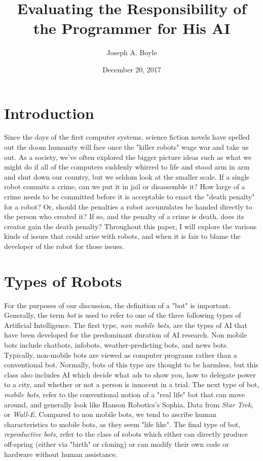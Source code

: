 \documentclass[12]{article}
\title{Evaluating the Responsibility of the Programmer for His AI}
\author{Joseph A. Boyle}
\date{December 20, 2017}
\begin{document}
\maketitle

\section{Introduction}
Since the days of the first computer systems, science fiction novels have spelled out the doom humanity will face once the "killer robots" wage war and take us out. As a society, we've often explored the bigger picture ideas such as what we might do if all of the computers suddenly whirred to life and stood arm in arm and shut down our country, but we seldom look at the smaller scale. If a single robot commits a crime, can we put it in jail or disassemble it? How large of a crime needs to be committed before it is acceptable to enact the "death penalty" for a robot? Or, should the penalties a robot accumulates be handed directly to the person who created it? If so, and the penalty of a crime is death, does its creator gain the death penalty? Throughout this paper, I will explore the various kinds of issues that could arise with robots, and when it is fair to blame the developer of the robot for those issues.

\section{Types of Robots}
	For the purposes of our discussion, the definition of a "bot" is important. Generally, the term \textit{bot} is used to refer to one of the three following types of Artificial Intelligence. The first type, \textit{non mobile bots}, are the types of AI that have been developed for the predominant duration of AI research. Non mobile bots include chatbots, infobots, weather-predicting bots, and news bots. Typically, non-mobile bots are viewed as computer programs rather than a conventional bot. Normally, bots of this type are thought to be harmless, but this class also includes AI which decide what ads to show you, how to delegate power to a city, and whether or not a person is innocent in a trial. The next type of bot,  \textit{mobile bots}, refer to the conventional notion of a "real life" bot that can move around, and generally look like Hanson Robotics's Sophia, Data from \textit{Star Trek}, or \textit{Wall-E}. Compared to non mobile bots, we tend to ascribe human characteristics to mobile bots, as they seem "life like". The final type of bot, \textit{reproductive bots}, refer to the class of robots which either can directly produce off-spring (either via "birth" or cloning) or can modify their own code or hardware without human assistance. 
	
\end{document}
